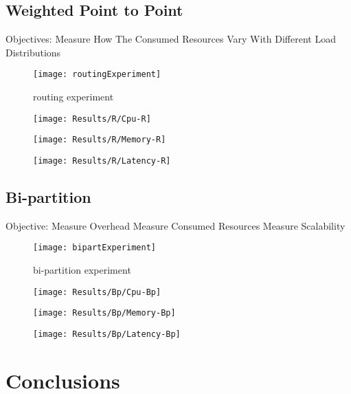 \subsection{Weighted Point to Point} %
\label{sec:weighted point to point}

Objectives:
Measure How The Consumed Resources Vary With Different Load Distributions

\begin{figure}[htbp]
    \centering
    \texttt{[image: routingExperiment]}
    \caption{routing experiment}
    \label{fig:gantt}
\end{figure}

\begin{figure}[htbp]
    \centering
    \texttt{[image: Results/R/Cpu-R]}
    \label{fig:gantt}
\end{figure}

\begin{figure}[htbp]
    \centering
    \texttt{[image: Results/R/Memory-R]}
    \label{fig:gantt}
\end{figure}

\begin{figure}[htbp]
    \centering
    \texttt{[image: Results/R/Latency-R]}
    \label{fig:gantt}
\end{figure}

\newpage



\subsection{Bi-partition} %
\label{sec:bi-partition}

Objective:
Measure Overhead
Measure Consumed Resources
Measure Scalability

\begin{figure}[htbp]
    \centering
    \texttt{[image: bipartExperiment]}
    \caption{bi-partition experiment}
    \label{fig:gantt}
\end{figure}

\begin{figure}[htbp]
    \centering
    \texttt{[image: Results/Bp/Cpu-Bp]}
    \label{fig:gantt}
\end{figure}

\begin{figure}[htbp]
    \centering
    \texttt{[image: Results/Bp/Memory-Bp]}
    \label{fig:gantt}
\end{figure}

\begin{figure}[htbp]
    \centering
    \texttt{[image: Results/Bp/Latency-Bp]}
    \label{fig:gantt}
\end{figure}

\section{Conclusions} %
\label{sec:conclusions}